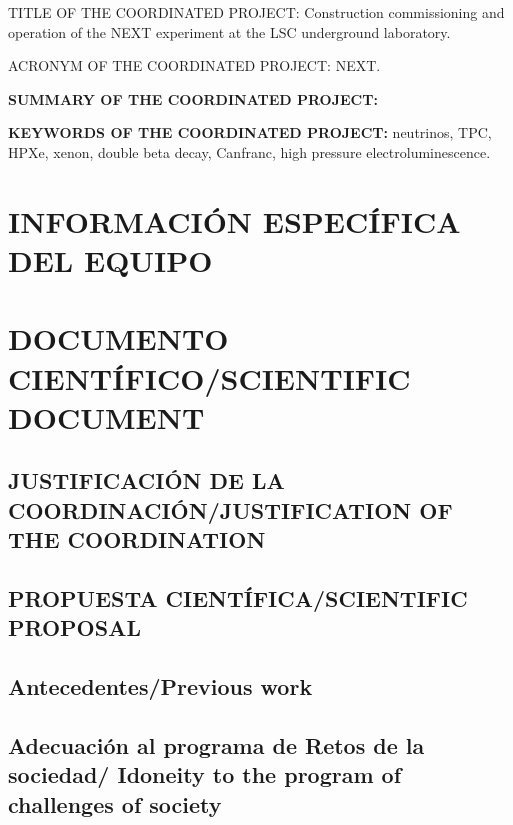 \documentclass[a4paper,11pt,oneside]{article}
\begin{document}
 \vspace{0.6cm}
{\sc TITLE OF THE COORDINATED PROJECT:} Construction commissioning and operation of the NEXT experiment at the LSC underground laboratory. 
\vspace{0.3cm}

{\sc ACRONYM OF THE COORDINATED PROJECT:} NEXT.
\vspace{0.3cm}

{\bf SUMMARY OF THE COORDINATED PROJECT:} 
\vspace{0.3cm}



 \vspace{0.3cm}

{\bf KEYWORDS OF THE COORDINATED PROJECT:} neutrinos, TPC, HPXe, xenon, double beta decay, Canfranc, high pressure electroluminescence. 

\section{INFORMACIÓN ESPECÍFICA DEL EQUIPO}
\newpage

\section{\bf DOCUMENTO CIENTÍFICO/SCIENTIFIC DOCUMENT}

\subsection{\sc JUSTIFICACIÓN DE LA COORDINACIÓN/JUSTIFICATION OF THE COORDINATION}
\vspace{0.3cm}



\subsection{\bf PROPUESTA CIENTÍFICA/SCIENTIFIC PROPOSAL}



\subsection*{\sc Antecedentes/Previous work}



\subsection*{\sc Adecuación al programa de Retos de la sociedad/ Idoneity to the program of challenges of society  }
\end{document}
